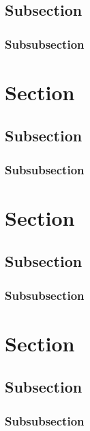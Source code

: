 \subsection{Subsection}
\lipsum[2] %

\subsubsection{Subsubsection}
\lipsum[3] %

\section{Section}
\lipsum[1] %

\subsection{Subsection}
\lipsum[2] %

\subsubsection{Subsubsection}
\lipsum[3] %

\section{Section}
\lipsum[1] %

\subsection{Subsection}
\lipsum[2] %

\subsubsection{Subsubsection}
\lipsum[3] %

\section{Section}
\lipsum[1] %

\subsection{Subsection}
\lipsum[2] %

\subsubsection{Subsubsection}
\lipsum[3] %

